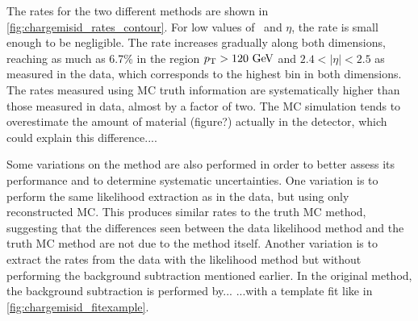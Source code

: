 The rates for the two different methods are 
shown in \fig\ref{fig:chargemisid_rates_contour}.
For low values of \pt~and $\eta$, the rate is small enough to be negligible. 
The rate increases gradually along both dimensions, reaching as much as
6.7\% in the region $\pt > 120\GeV$ and $2.4 < |\eta| < 2.5$ as measured
in the data, which corresponds to the highest bin in both dimensions. 
The rates measured using MC truth information are systematically higher
than those measured in data, almost by a factor of two. The MC simulation
tends to overestimate the amount of material (figure?) actually in the
detector, which could explain this difference....





Some variations on the method are also performed
in order to better assess its performance 
and to determine systematic uncertainties.
One variation is to perform the same likelihood extraction
as in the data, but using only reconstructed MC. This produces
similar rates to the truth MC method, suggesting that the differences
seen between the data likelihood method and the truth MC method
are not due to the method itself. 
Another variation is to extract the rates from the data with the 
likelihood method but without performing the background
subtraction mentioned earlier. In the original method, 
the background subtraction is performed by... 
...with a template fit like in \fig\ref{fig:chargemisid_fitexample}.

